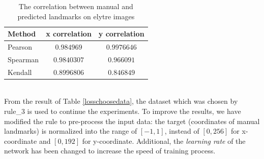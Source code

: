 \documentclass[12pt,a4paper]{article}
\begin{document}
\begin{table}[h!]
	\centering
	\begin{tabular}{l c c}
		Method & x correlation & y correlation \\ \hline
		Pearson & $0.984969$ & $0.9976646$ \\ \hline
		Spearman & $0.9840307$ & $0.966091$ \\ \hline
		Kendall & $0.8996806$ & $0.846849$ \\ \hline
	\end{tabular}
	\caption{The correlation between manual and predicted landmarks on elytre images}
	\label{elytre}
\end{table}~\\
From the result of Table \ref{losschoosedata}, the dataset which was chosen by rule\_3 is used to continue the experiments. To improve the results, we have modified the rule to pre-process the input data: the target (coordinates of manual landmarks) is normalized into the range of $[-1,1]$, instead of $[0,256]$ for x-coordinate and $[0,192]$ for y-coordinate. Additional, the \textit{learning rate} of the network has been changed to increase the speed of training process.
\end{document}

